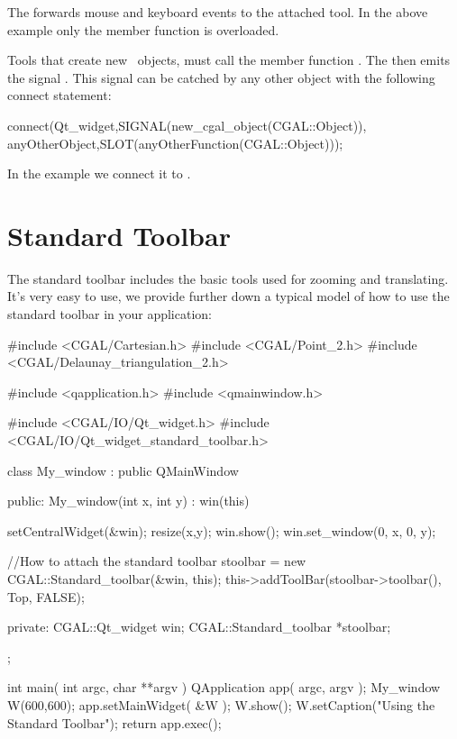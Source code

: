 The  forwards mouse and keyboard events to the attached tool.
In the above example only the  member function is overloaded.

Tools that create new \cgal\ objects, must call the member 
function . The  
then emits the signal . This signal can be 
catched by any other object with the following connect statement:

\begin{ccExampleCode}
connect(Qt_widget,SIGNAL(new_cgal_object(CGAL::Object)),
        anyOtherObject,SLOT(anyOtherFunction(CGAL::Object)));
\end{ccExampleCode}

In the example we connect it to .

\section{Standard Toolbar}
\label{Qt_widget_standard_toolbar}

The standard toolbar includes the basic tools used for zooming and translating.
It's very easy to use, we provide further down a typical model of how to use 
the standard toolbar in your application:

\begin{ccExampleCode}
#include <CGAL/Cartesian.h>
#include <CGAL/Point_2.h>
#include <CGAL/Delaunay_triangulation_2.h>


#include <qapplication.h>
#include <qmainwindow.h>

#include <CGAL/IO/Qt_widget.h>
#include <CGAL/IO/Qt_widget_standard_toolbar.h>

class My_window : public QMainWindow{
public:
  My_window(int x, int y) : win(this)
  {
    setCentralWidget(&win);
    resize(x,y);
    win.show();
    win.set_window(0, x, 0, y);
    
    //How to attach the standard toolbar
    stoolbar = new CGAL::Standard_toolbar(&win, this);
    this->addToolBar(stoolbar->toolbar(), Top, FALSE);
  }
private:
  CGAL::Qt_widget win;
  CGAL::Standard_toolbar *stoolbar;
};

int main( int argc, char **argv )
{
    QApplication app( argc, argv );
    My_window W(600,600);
    app.setMainWidget( &W );
    W.show();
    W.setCaption("Using the Standard Toolbar");
    return app.exec();
}
\end{ccExampleCode}










